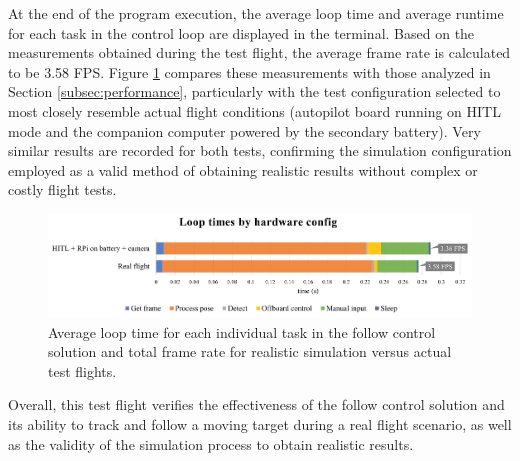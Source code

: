 At the end of the program execution, the average loop time and average runtime for each task in the control loop are displayed in the terminal. Based on the measurements obtained during the test flight, the average frame rate is calculated to be 3.58 FPS. Figure \ref{fig:flight-performance} compares these measurements with those analyzed in Section \ref{subsec:performance}, particularly with the test configuration selected to most closely resemble actual flight conditions (autopilot board running on HITL mode and the companion computer powered by the secondary battery). Very similar results are recorded for both tests, confirming the simulation configuration employed as a valid method of obtaining realistic results without complex or costly flight tests.


\begin{figure}[H]
  \centering
  \includegraphics[width=\textwidth, keepaspectratio]{img/perf-hitl-flight.png}
  \caption{Average loop time for each individual task in the follow control solution and total frame rate for realistic simulation versus actual test flights.}
  \label{fig:flight-performance}
\end{figure}

Overall, this test flight verifies the effectiveness of the follow control solution and its ability to track and follow a moving target during a real flight scenario, as well as the validity of the simulation process to obtain realistic results.